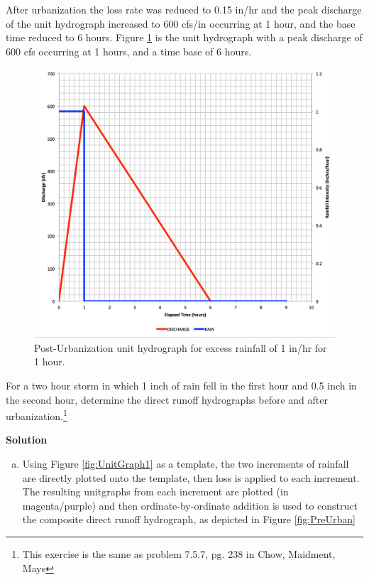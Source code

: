 \documentclass[12pt]{article}
\begin{document}
\begin{enumerate}
After urbanization the loss rate was reduced to 0.15 in/hr and the peak discharge of the unit hydrograph increased to 600 cfs/in occurring at 1 hour, and the base time reduced to 6 hours.    Figure \ref{fig:UnitGraph2} is the unit hydrograph with a peak discharge of 600 cfs occurring at 1 hours, and a time base of 6 hours.

\begin{figure}[h!] %
   \centering
   \includegraphics[width=5in]{UnitGraph2.jpg} 
   \caption{Post-Urbanization unit hydrograph for excess rainfall of 1 in/hr for 1 hour.}
   \label{fig:UnitGraph2}
\end{figure}

For a two hour storm in which 1 inch of rain fell in the first hour and 0.5 inch in the second hour, determine the direct runoff hydrographs before and after urbanization.\footnote{This exercise is the same as problem 7.5.7, pg. 238 in Chow, Maidment, Mays}

\clearpage

\textbf{Solution}

\begin{enumerate}[a)]

\item Using Figure \ref{fig:UnitGraph1} as a template, the two increments of rainfall are directly plotted onto the template, then loss is applied to each increment.  The resulting unitgraphs from each increment are plotted (in magenta/purple) and then ordinate-by-ordinate addition is used to construct the composite direct runoff hydrograph, as depicted in Figure \ref{fig:PreUrban}


\end{enumerate}
\end{enumerate}
\end{document}
